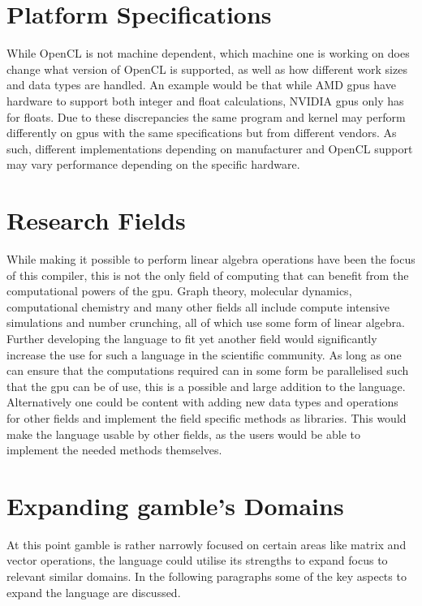 \section{Platform Specifications}
While OpenCL is not machine dependent, which machine one is working on does change what version of OpenCL is supported, as well as how different work sizes and data types are handled.
An example would be that while AMD \acrshort{gpu}s have hardware to support both integer and float calculations, NVIDIA \acrshort{gpu}s only has for floats. \citep{CUDAOpenCLOptimisation} 
Due to these discrepancies the same program and kernel may perform differently on \acrshort{gpu}s with the same specifications but from different vendors.
As such, different implementations depending on manufacturer and OpenCL support may vary performance depending on the specific hardware.

\section{Research Fields}
While making it possible to perform linear algebra operations have been the focus of this compiler, this is not the only field of computing that can benefit from the computational powers of the \acrshort{gpu}.
Graph theory, molecular dynamics, computational chemistry and many other fields all include compute intensive simulations and number crunching, all of which use some form of linear algebra.
Further developing the language to fit yet another field would significantly increase the use for such a language in the scientific community.
As long as one can ensure that the computations required can in some form be parallelised such that the \acrshort{gpu} can be of use, this is a possible and large addition to the language.
Alternatively one could be content with adding new data types and operations for other fields and implement the field specific methods as libraries.
This would make the language usable by other fields, as the users would be able to implement the needed methods themselves.

\section{Expanding \gls{gamble}'s Domains}
At this point \gls{gamble} is rather narrowly focused on certain areas like matrix and vector operations, the language could utilise its strengths to expand focus to relevant similar domains.
In the following paragraphs some of the key aspects to expand the language are discussed. 

